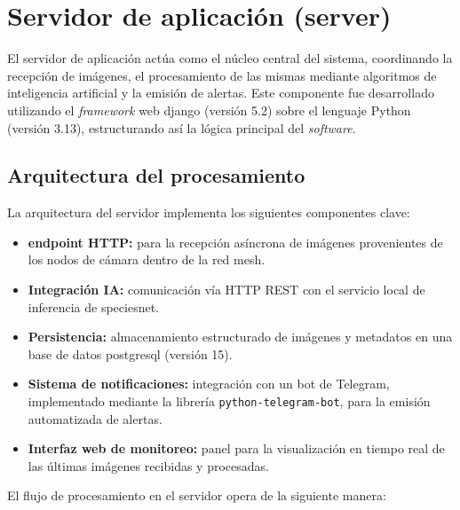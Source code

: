 \documentclass[a4paper, 12pt]{report}
\begin{document}
\section{Servidor de aplicación (server)}

El servidor de aplicación actúa como el núcleo central del sistema, coordinando la recepción de imágenes, el procesamiento de las mismas mediante algoritmos de inteligencia artificial y la emisión de alertas. Este componente fue desarrollado utilizando el \textit{framework} web \gls{django} (versión 5.2) sobre el lenguaje Python (versión 3.13), estructurando así la lógica principal del \textit{software}.

\subsection{Arquitectura del procesamiento}

La arquitectura del servidor implementa los siguientes componentes clave:

\begin{itemize}
  \item \textbf{\Gls{endpoint} HTTP:} para la recepción asíncrona de imágenes provenientes de los nodos de cámara dentro de la red mesh.
  \item \textbf{Integración IA:} comunicación vía HTTP REST con el servicio local de inferencia de \gls{speciesnet}.
  \item \textbf{Persistencia:} almacenamiento estructurado de imágenes y metadatos en una base de datos \gls{postgresql} (versión 15).
  \item \textbf{Sistema de notificaciones:} integración con un bot de Telegram, implementado mediante la librería \texttt{python-telegram-bot}, para la emisión automatizada de alertas.
  \item \textbf{Interfaz web de monitoreo:} panel para la visualización en tiempo real de las últimas imágenes recibidas y procesadas.
\end{itemize}

El flujo de procesamiento en el servidor opera de la siguiente manera:
\end{document}
